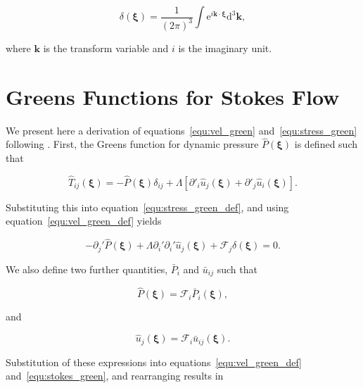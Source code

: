 \documentclass[12pt]{article}
\begin{document}
\begin{equation}
\label{equ:delta_int_def}
\delta (\boldsymbol{\xi}) = \frac{1}{(2 \pi)^{3}} \int \mathrm{e}^{i \boldsymbol{k} \cdot \boldsymbol{\xi}} \mathrm{d}^{3} \boldsymbol{k},
\end{equation}

where $\boldsymbol{k}$ is the transform variable and $i$ is the imaginary unit.

\section{Greens Functions for Stokes Flow}
\label{app:Greens}

We present here a derivation of equations~\ref{equ:vel_green} and~\ref{equ:stress_green} following \citet{Ladyzhenskaya63}. First, the Greens function for dynamic pressure $\hat{P}(\boldsymbol{\xi})$ is defined such that

\begin{equation}
\label{equ:press_green_def}
\hat{T}_{ij}(\boldsymbol{\xi}) = - \hat{P}(\boldsymbol{\xi}) \delta_{ij} + \Lambda[\partial'_{i} \hat{u}_{j}(\boldsymbol{\xi}) + \partial'_{j} \hat{u}_{i}(\boldsymbol{\xi})] .
\end{equation}


Substituting this into equation~\ref{equ:stress_green_def}, and using equation~\ref{equ:vel_green_def} yields 

\begin{equation}
\label{equ:stokes_green}
-\partial_{j}' \hat{P}(\boldsymbol{\xi}) + \Lambda \partial_{i}' \partial_{i}' \hat{u}_{j}(\boldsymbol{\xi}) + \mathcal{F}_{j} \delta(\boldsymbol{\xi}) = 0 .
\end{equation}


We also define two further quantities, $\bar{P}_{i}$ and $\bar{u}_{ij}$ such that

\begin{equation}
\label{equ:pres_bar}
\hat{P} (\boldsymbol{\xi}) = \mathcal{F}_{i} \bar{P}_{i} (\boldsymbol{\xi}) ,
\end{equation}

and 

\begin{equation}
\label{equ:vel_bar}
\hat{u}_{j}(\boldsymbol{\xi}) = \mathcal{F}_{i} \bar{u}_{ij} (\boldsymbol{\xi}) .
\end{equation}

Substitution of these expressions into equations~\ref{equ:vel_green_def} and~\ref{equ:stokes_green}, and rearranging results in
\end{document}
